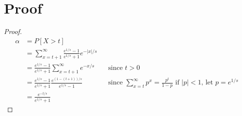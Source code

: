 \documentclass{article}
\begin{document}
\section{Proof} 
 
\begin{proof} 
    \begin{align*} 
        \alpha &= P[X > t] \\ 
        &= \sum_{x=t + 1}^{\infty} \frac{e^{1/s} - 1}{e^{1/s} + 1} e^{-|x|/s} \\ 
        &= \frac{e^{1/s} - 1}{e^{1/s} + 1} \sum_{x=t + 1}^{\infty} e^{-x/s}  
            && \text{since } t > 0 \\ 
        &= \frac{e^{1/s} - 1}{e^{1/s} + 1} \frac{e^{(1-(t + 1))/s}}{e^{1/s} - 1}  
            && \text{since } \sum_{x=t}^\infty p^x = \frac{p^t}{1 - p} \text{ if } |p| < 1 \text{, let } p = e^{1/s}\\ 
        &= \frac{e^{-t/s}}{e^{1/s} + 1} 
    \end{align*} 
 
\end{proof} 
 
\end{document}
